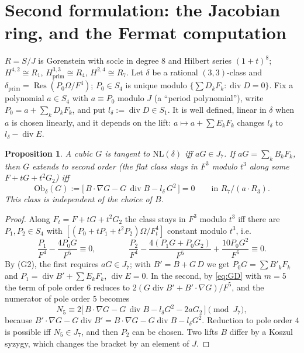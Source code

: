 \documentclass[10pt]{article}
\numberwithin{equation}{section}
\newtheorem{proposition}[theorem]{Proposition}
\theoremstyle{remark}
\newcommand{\NL}{\mathrm{NL}}
\newcommand{\Res}{\operatorname{Res}}
\newcommand{\dv}{\operatorname{div}}
\begin{document}
\section{Second formulation: the Jacobian ring, and the Fermat computation}\label{sec:jac}
$R=S/J$ is Gorenstein with socle in degree $8$ and Hilbert series $(1+t)^8$; $H^{4,2}\cong R_1$,
$H^{3,3}_{\mathrm{prim}}\cong R_4$, $H^{2,4}\cong R_7$. Let $\delta$ be a rational $(3,3)$-class and
$\delta_{\mathrm{prim}}=\Res(P_0\Omega/F^4)$; $P_0\in S_4$ is unique modulo $\{\sum D_kF_k:\dv D=0\}$. Fix a
polynomial $a\in S_4$ with $a\equiv P_0$ modulo $J$ (a ``period polynomial''), write $P_0=a+\sum_kD_kF_k$, and
put $l_\delta:=\dv D\in S_1$. It is well defined, linear in $\delta$ when $a$ is chosen linearly, and it depends
on the lift: $a\mapsto a+\sum E_kF_k$ changes $l_\delta$ to $l_\delta-\dv E$.

\begin{proposition}\label{prop:ob}
A cubic $G$ is tangent to $\NL(\delta)$ iff $aG\in J_7$. If $aG=\sum_kB_kF_k$, then $G$ extends to second order
\textup{(}the flat class stays in $F^3$ modulo $t^3$ along some $F+tG+t^2G_2$\textup{)} iff
\begin{equation}\label{eq:ob}
\mathrm{Ob}_\delta(G):=\bigl[\,B\cdot\nabla G-G\,\dv B-l_\delta\,G^2\,\bigr]=0\qquad\text{in }R_7/(a\cdot R_3).
\end{equation}
This class is independent of the choice of $B$.
\end{proposition}
\begin{proof}
Along $F_t=F+tG+t^2G_2$ the class stays in $F^3$ modulo $t^3$ iff there are $P_1,P_2\in S_4$ with
$[(P_0+tP_1+t^2P_2)\Omega/F_t^4]$ constant modulo $t^3$, i.e.
\begin{equation}\label{eq:o12}
\frac{P_1}{F^4}-\frac{4P_0G}{F^5}\equiv0,\qquad\qquad
\frac{P_2}{F^4}-\frac{4(P_1G+P_0G_2)}{F^5}+\frac{10P_0G^2}{F^6}\equiv0 .
\end{equation}
By (G2), the first requires $aG\in J_7$; with $B'=B+G\,D$ we get $P_0G=\sum B'_kF_k$ and
$P_1=\dv B'+\sum E_kF_k$, $\dv E=0$. In the second, by \eqref{eq:GD} with $m=5$ the term of pole order $6$
reduces to $2(G\dv B'+B'\cdot\nabla G)/F^5$, and the numerator of pole order $5$ becomes
\begin{equation}\label{eq:N5}
N_5\equiv2\bigl[\,B\cdot\nabla G-G\,\dv B-l_\delta G^2-2aG_2\,\bigr]\pmod{J_7},
\end{equation}
because $B'\cdot\nabla G-G\dv B'=B\cdot\nabla G-G\dv B-l_\delta G^2$. Reduction to pole order $4$ is possible
iff $N_5\in J_7$, and then $P_2$ can be chosen. Two lifts $B$ differ by a Koszul syzygy, which changes the
bracket by an element of $J$.
\end{proof}
\end{document}
